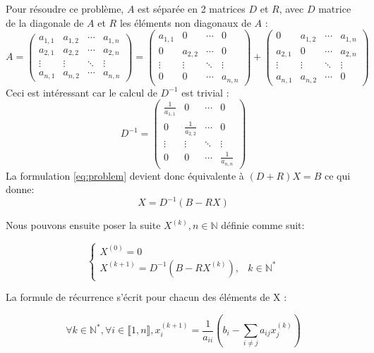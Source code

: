 \documentclass[11pt, a4paper]{article}
\begin{document}
Pour résoudre ce problème, $A$ est séparée en 2 matrices $D$ et $R$, avec $D$ matrice de la diagonale de $A$ et $R$ les éléments non diagonaux de $A$ :
\[
A =
 \begin{pmatrix}
  a_{1,1} & a_{1,2} & \cdots & a_{1,n} \\
  a_{2,1} & a_{2,2} & \cdots & a_{2,n} \\
  \vdots  & \vdots  & \ddots & \vdots  \\
  a_{n,1} & a_{n,2} & \cdots & a_{n,n}
 \end{pmatrix}
 =
  \begin{pmatrix}
  a_{1,1} & 0 & \cdots & 0 \\
  0 & a_{2,2} & \cdots & 0 \\
  \vdots  & \vdots  & \ddots & \vdots  \\
  0 & 0 & \cdots & a_{n,n}
 \end{pmatrix}
 +
  \begin{pmatrix}
  0 & a_{1,2} & \cdots & a_{1,n} \\
  a_{2,1} & 0 & \cdots & a_{2,n} \\
  \vdots  & \vdots  & \ddots & \vdots  \\
  a_{n,1} & a_{n,2} & \cdots & 0
 \end{pmatrix}
\]
Ceci est intéressant car le calcul de $D^{-1}$ est trivial :
\[
D^{-1} =
  \begin{pmatrix}
  \frac{1}{a_{1,1}} & 0 & \cdots & 0 \\
  0 & \frac{1}{a_{2,2}} & \cdots & 0 \\
  \vdots  & \vdots  & \ddots & \vdots  \\
  0 & 0 & \cdots & \frac{1}{a_{n,n}}
 \end{pmatrix}
\]
La formulation \eqref{eq:problem} devient donc équivalente à \((D+R)X=B\)
ce qui donne:
\begin{equation} \label{eq:reeq}
    X = D^{-1} (B-RX)
\end{equation}

Nous pouvons ensuite poser la suite $X^{(k)}, n \in \mathds{N}$ définie comme suit:

\[
\left\{
    \begin{array}{lr}
        X^{(0)} = 0 \\
        X^{(k+1)} = D^{-1} (B-RX^{(k)}),& k \in \mathds{N}^*
    \end{array}
\right.
\]

La formule de récurrence s'écrit pour chacun des éléments de X :

\begin{equation} \label{eq:rec}
    \forall k \in \mathds{N}^*, \forall i \in \llbracket 1,n \rrbracket,
    x^{(k+1)}_i = \frac{1}{a_{ii}} (b_i - \sum_{i \neq j} a_{ij}x^{(k)}_j)
\end{equation}
\end{document}
